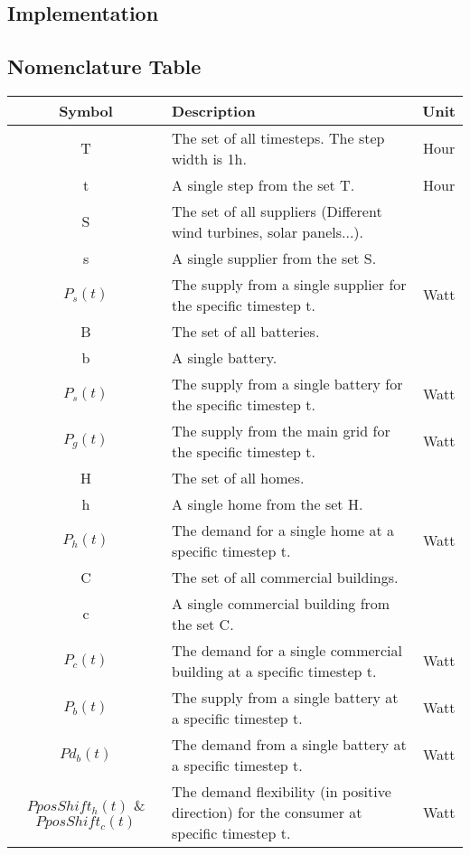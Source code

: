 \subsection{Implementation}


\subsection{Nomenclature Table}
	\begin{longtable}{|c|p{}|c|}
		\toprule
		\textbf{Symbol} & \textbf{Description} & \textbf{Unit} \\ \midrule
		T & The set of all timesteps. The step width is 1h. & Hour \\ \midrule
		t & A single step from the set T. & Hour \\ \midrule
		S & The set of all suppliers (Different wind turbines, solar panels...). &  \\ \midrule
		s & A single supplier from the set S. & \\ \midrule
		$P_{s}(t)$ & The supply from a single supplier for the specific timestep t. & Watt\\ \midrule
		B & The set of all batteries. & \\ \midrule
		b & A single battery. & \\ \midrule
		$P_{s}(t)$ & The supply from a single battery for the specific timestep t. & Watt \\ \midrule
		$P_{g}(t)$ & The supply from the main grid for the specific timestep t. & Watt \\ \midrule
		H & The set of all homes. & \\ \midrule
		h & A single home from the set H. & \\ \midrule
		$P_{h}(t)$ & The demand for a single home at a specific timestep t. & Watt\\ \midrule
		C & The set of all commercial buildings. & \\ \midrule
		c & A single commercial building from the set C. & \\ \midrule
		$P_{c}(t)$ & The demand for a single commercial building at a specific timestep t. & Watt \\ \midrule
		$P_{b}(t)$ & The supply from a single battery at a specific timestep t. & Watt \\ \midrule
		$Pd_{b}(t)$ & The demand from a single battery at a specific timestep t. & Watt \\ \midrule
		$PposShift_{h}(t)$ \& $PposShift_{c}(t)$ & The demand flexibility (in positive direction) for the consumer at specific timestep t. & Watt \\ \midrule

\end{longtable}

